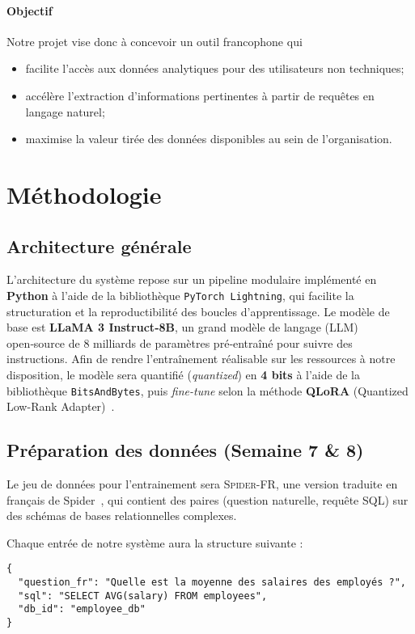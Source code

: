 \documentclass[12pt]{article}
\begin{document}
\paragraph{Objectif} Notre projet vise donc à concevoir un outil francophone qui
\begin{itemize}
\item facilite l’accès aux données analytiques pour des utilisateurs non techniques;
\item accélère l’extraction d’informations pertinentes à partir de requêtes en langage naturel;
\item maximise la valeur tirée des données disponibles au sein de l’organisation.
\end{itemize}

\section{Méthodologie}

\subsection{Architecture générale}
L’architecture du système repose sur un pipeline modulaire implémenté en \textbf{Python} à l’aide de la bibliothèque \texttt{PyTorch Lightning}, qui facilite la structuration et la reproductibilité des boucles d’apprentissage. Le modèle de base est \textbf{LLaMA 3 Instruct‑8B}, un grand modèle de langage (LLM) open‑source de 8 milliards de paramètres pré‑entraîné pour suivre des instructions. Afin de rendre l'entraînement réalisable sur les ressources à notre disposition, le modèle sera quantifié (\textit{quantized}) en \textbf{4 bits} à l’aide de la bibliothèque \texttt{BitsAndBytes}, puis \textit{fine-tune} selon la méthode \textbf{QLoRA} (Quantized Low-Rank Adapter)~\cite{dettmers2023qlora}.

\subsection{Préparation des données (Semaine 7 \& 8)}
Le jeu de données pour l'entrainement sera \textsc{Spider-FR}, une version traduite en français de Spider~\cite{yu2019spider}, qui contient des paires (question naturelle, requête SQL) sur des schémas de bases relationnelles complexes.

Chaque entrée de notre système aura la structure suivante :

\begin{verbatim}
{
  "question_fr": "Quelle est la moyenne des salaires des employés ?",
  "sql": "SELECT AVG(salary) FROM employees",
  "db_id": "employee_db"
}
\end{verbatim}
\end{document}

